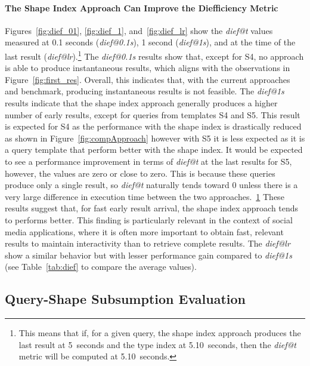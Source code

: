 \paragraph{The Shape Index Approach Can Improve the Diefficiency Metric}
Figures~\ref{fig:dief_01}, \ref{fig:dief_1}, and~\ref{fig:dief_lr} show the \textit{dief@t} values measured at 0.1 seconds (\textit{dief@0.1s}), 1 second (\textit{dief@1s}), and at the time of the last result (\textit{dief@lr}).\footnote{\label{fn:dief_lt}This means that if, for a given query, the shape index approach produces the last result at 5~seconds and the type index at 5.10~seconds, then the \textit{dief@t} metric will be computed at 5.10~seconds.}
The \textit{dief@0.1s} results show that, except for S4, no approach is able to produce instantaneous results, which aligns with the observations in Figure~\ref{fig:first_res}.
Overall, this indicates that, with the current approaches and benchmark, producing instantaneous results is not feasible.
The \textit{dief@1s} results indicate that the shape index approach generally produces a higher number of early results, except for queries from templates S4 and S5.
This result is expected for S4 as the performance with the shape index is drastically reduced as shown in Figure~\ref{fig:compApproach} however with S5 it is less expected as it is a query template that perform better with the shape index.
It would be expected to see a performance improvement in terms of \textit{dief@t} at the last results for S5, however, the values are zero or close to zero.
This is because these queries produce only a single result, so \textit{dief@t} naturally tends toward 0 unless there is a very large difference in execution time between the two approaches.~\ref{fn:dief_lt}
These results suggest that, for fast early result arrival, the shape index approach tends to performs better.
This finding is particularly relevant in the context of social media applications, where it is often more important to obtain fast, relevant results to maintain interactivity than to retrieve complete results.
The \textit{dief@lr} show a similar behavior but with lesser performance gain compared to \textit{dief@1s} (see Table~\ref{tab:dief} to compare the average values).


\subsection{Query-Shape Subsumption Evaluation} \label{sec:experimentAlgoSubsumption}

